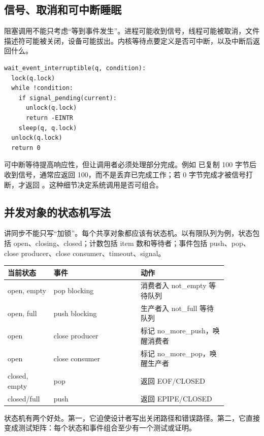 \subsection{信号、取消和可中断睡眠}

阻塞调用不能只考虑“等到事件发生”。进程可能收到信号，线程可能被取消，文件描述符可能被关闭，设备可能拔出。内核等待点要定义是否可中断，以及中断后返回什么。

\begin{lstlisting}
wait_event_interruptible(q, condition):
  lock(q.lock)
  while !condition:
    if signal_pending(current):
      unlock(q.lock)
      return -EINTR
    sleep(q, q.lock)
  unlock(q.lock)
  return 0
\end{lstlisting}

可中断等待提高响应性，但让调用者必须处理部分完成。例如  已复制 100 字节后收到信号，通常应返回 100，而不是丢弃已完成工作；若 0 字节完成才被信号打断，才返回 。这种细节决定系统调用是否可组合。

\subsection{并发对象的状态机写法}

讲同步不能只写“加锁”。每个共享对象都应该有状态机。以有限队列为例，状态包括 open、closing、closed；计数包括 item 数和等待者；事件包括 push、pop、close producer、close consumer、timeout、signal。

\begin{longtable}{|p{0.18\linewidth}|p{0.34\linewidth}|p{0.34\linewidth}|}
\toprule
当前状态 & 事件 & 动作 \\
\midrule
open, empty & pop blocking & 消费者入 not\_empty 等待队列 \\\tablerowrule
open, full & push blocking & 生产者入 not\_full 等待队列 \\\tablerowrule
open & close producer & 标记 no\_more\_push，唤醒消费者 \\\tablerowrule
open & close consumer & 标记 no\_more\_pop，唤醒生产者 \\\tablerowrule
closed, empty & pop & 返回 EOF/CLOSED \\\tablerowrule
closed/full & push & 返回 EPIPE/CLOSED \\
\bottomrule
\end{longtable}

状态机有两个好处。第一，它迫使设计者写出关闭路径和错误路径。第二，它直接变成测试矩阵：每个状态和事件组合至少有一个测试或证明。

